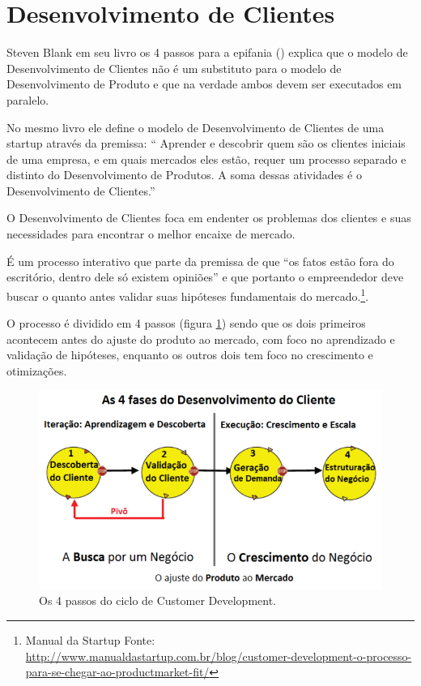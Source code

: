 \section{Desenvolvimento de Clientes}
\par Steven Blank em seu livro os 4 passos para a epifania (\cite{blank:03}) explica que o modelo de Desenvolvimento de Clientes não é um substituto para o modelo de Desenvolvimento de Produto e que na verdade ambos devem ser executados em paralelo.
\par No mesmo livro ele define o modelo de Desenvolvimento de Clientes de uma startup através da premissa: “ Aprender e descobrir quem são os clientes iniciais de uma empresa, e em quais mercados eles estão, requer um processo separado e distinto do Desenvolvimento de Produtos. A soma dessas atividades é o Desenvolvimento de Clientes.”
\par O Desenvolvimento de Clientes foca em endenter os problemas dos clientes e suas necessidades para encontrar o melhor encaixe de mercado.
\par É um processo interativo que parte da premissa de que “os fatos estão fora do escritório, dentro dele só existem opiniões” e que portanto o empreendedor deve buscar o quanto antes validar suas hipóteses fundamentais do mercado.\footnote{Manual da Startup Fonte: \url{http://www.manualdastartup.com.br/blog/customer-development-o-processo-para-se-chegar-ao-productmarket-fit/}}.
\par O processo é dividido em 4 passos (figura \ref{fig:customerdevelopment}) sendo que os dois primeiros acontecem antes do ajuste do produto ao mercado, com foco no aprendizado e validação de hipóteses, enquanto os outros dois tem foco no crescimento e otimizações.
\begin{figure}[htb]
\centering
\includegraphics[width=15cm]{figuras/customerdevelopment}
\caption{\label{fig:customerdevelopment}Os 4 passos do ciclo de Customer Development.}
\end{figure}

